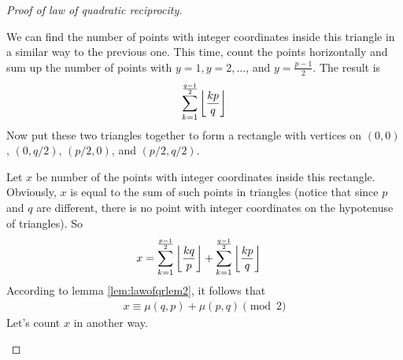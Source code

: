 \begin{proof}[Proof of law of quadratic reciprocity]
\begin{center}
	\end{center}
	We can find the number of points with integer coordinates inside this triangle in a similar way to the previous one. This time, count the points horizontally and sum up the number of points with $y=1, y=2, \ldots$, and $y=\frac{p-1}{2}$. The result is
		\begin{align*}
			\sum_{k=1}^{\frac{q-1}{2}} \left\lfloor{\frac{kp}{q}}\right\rfloor
		\end{align*}
	Now put these two triangles together to form a rectangle with vertices on $(0,0)$, $\left(0,q/2\right)$, $\left(p/2,0\right)$, and $\left(p/2,q/2\right)$.

	Let $x$ be number of the points with integer coordinates inside this rectangle. Obviously, $x$ is equal to the sum of such points in triangles (notice that since $p$ and $q$ are different, there is no point with integer coordinates on the hypotenuse of triangles). So
	\begin{align*}
		x
			& = \sum_{k=1}^{\frac{p-1}{2}} \left\lfloor{\frac{kq}{p}}\right\rfloor+ \sum_{k=1}^{\frac{q-1}{2}}\left\lfloor{\frac{kp}{q}}\right\rfloor
	\end{align*}
	According to lemma \eqref{lem:lawofqrlem2}, it follows that
	\begin{align}\label{eq:qrlawproof1}
	x \equiv \mu(q,p)+\mu(p,q) \pmod 2
	\end{align}
	Let's count $x$ in another way.
	\begin{center}
\end{center}
\end{proof}
